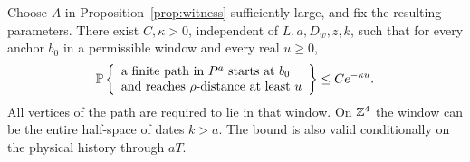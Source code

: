 \begin{proposition}\label{prop:path}
Choose \(A\) in Proposition~\ref{prop:witness} sufficiently large,
and fix the resulting parameters. There exist \(C,\kappa>0\),
independent of \(L,a,D_w,z,k\), such that for every anchor \(b_0\)
in a permissible window and every real \(u\ge0\),
\begin{equation}\label{eq:path}
 \mathbb P\left\{\begin{array}{l}
 \text{a finite path in }P^a\text{ starts at }b_0\\
 \text{and reaches }\rho\text{-distance at least }u
 \end{array}\right\}\le Ce^{-\kappa u}.
\end{equation}
All vertices of the path are required to lie in that window.
On \(\mathbb Z^4\) the window can be the entire half-space of dates \(k>a\).
The bound is also valid conditionally on the physical history
through \(aT\).
\end{proposition}
